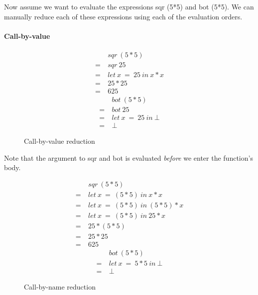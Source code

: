 Now assume we want to evaluate the expressions \<sqr (5*5)\> and \<bot (5*5)\>.
We can manually reduce each of these expressions using each of the evaluation
orders.

\paragraph{Call-by-value}

\begin{figure}[!h]
\centering
\begin{multicols}{2}
\noindent
\begin{align*}
     &sqr\ (5*5) \\
  =\ &sqr\ 25 \\
  =\ &let\ x\ =\ 25\ in\ x * x \\
  =\ &25 * 25 \\
  =\ &625
\end{align*}
\begin{align*}
     &bot\ (5*5) \\
  =\ &bot\ 25 \\
  =\ &let\ x\ =\ 25\ in\ \bot \\
  =\ &\bot
\end{align*}
\end{multicols}
\caption{Call-by-value reduction}
\label{fig:call-by-value}
\end{figure}

Note that the argument to \<sqr\> and \<bot\> is evaluated \emph{before}
we enter the function's body. 

\begin{figure}[!h]
\centering
\begin{multicols}{2}
\noindent
\begin{align*}
     &sqr\ (5*5) \\
  =\ &let\ x \  =\ (5*5)\ in\ x * x \\
  =\ &let\ x \  =\ (5*5)\ in\ (5*5) * x \\
  =\ &let\ x \  =\ (5*5)\ in\ 25 * x \\
  =\ &25 * (5*5) \\
  =\ &25 * 25 \\
  =\ &625
\end{align*}
\begin{align*}
     &bot\ (5*5) \\
  =\ &let\ x\ =\ 5*5\ in\ \bot \\
  =\ &\bot
\end{align*}
\end{multicols}
\caption{Call-by-name reduction}
\label{fig:call-by-name}
\end{figure}

